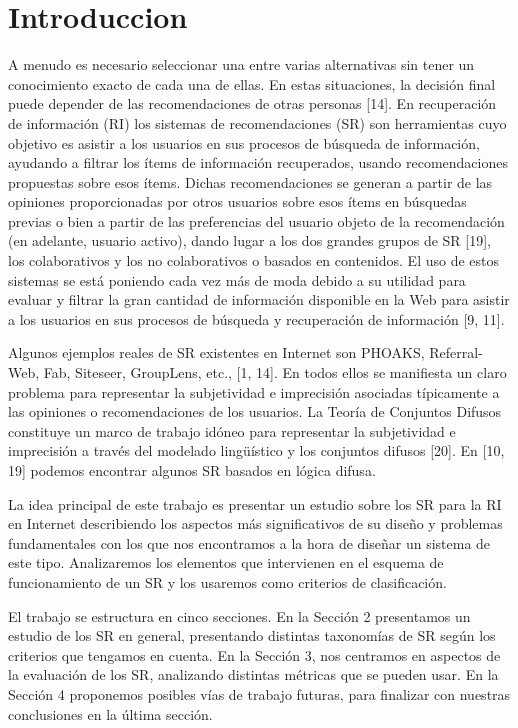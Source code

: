\section{Introduccion}
A menudo es necesario seleccionar una entre varias alternativas sin tener un conocimiento exacto de cada una de ellas. En estas situaciones, la decisión final puede depender de las recomendaciones de otras personas [14]. En recuperación de información (RI) los sistemas de recomendaciones (SR) son herramientas cuyo objetivo es asistir a los usuarios en sus procesos de búsqueda de información, ayudando a filtrar los ítems de información recuperados, usando recomendaciones propuestas sobre esos ítems. Dichas recomendaciones se generan a partir de las opiniones proporcionadas por otros usuarios sobre esos ítems en búsquedas previas o bien a partir de las preferencias del usuario objeto de la recomendación (en adelante, usuario activo), dando lugar a los dos grandes grupos de SR [19], los colaborativos y los no colaborativos o basados en contenidos. El uso de estos sistemas se está poniendo cada vez más de moda debido a su utilidad para evaluar y filtrar la gran cantidad de información disponible en la Web para asistir a los usuarios en sus procesos de búsqueda y recuperación de información [9, 11].

Algunos ejemplos reales de SR existentes en Internet son PHOAKS, Referral-Web, Fab, Siteseer, GroupLens, etc., [1, 14]. En todos ellos se manifiesta un claro problema para representar la subjetividad e imprecisión asociadas típicamente a las opiniones o recomendaciones de los usuarios. La Teoría de Conjuntos Difusos constituye un marco de trabajo idóneo para representar la subjetividad e imprecisión a través del modelado lingüístico y los conjuntos difusos [20]. En [10, 19] podemos encontrar algunos SR basados en lógica difusa.

La idea principal de este trabajo es presentar un estudio sobre los SR para la RI en Internet describiendo los aspectos más significativos de su diseño y problemas fundamentales con los que nos encontramos a la hora de diseñar un sistema de este tipo. Analizaremos los elementos que intervienen en el esquema de funcionamiento de un SR y los usaremos como criterios de clasificación.

El trabajo se estructura en cinco secciones. En la Sección 2 presentamos un estudio de los SR en general, presentando distintas taxonomías de SR según los criterios que tengamos en cuenta. En la Sección 3, nos centramos en aspectos de la evaluación de los SR, analizando distintas métricas que se pueden usar. En la Sección 4 proponemos posibles vías de trabajo futuras, para finalizar con nuestras conclusiones en la última sección.


